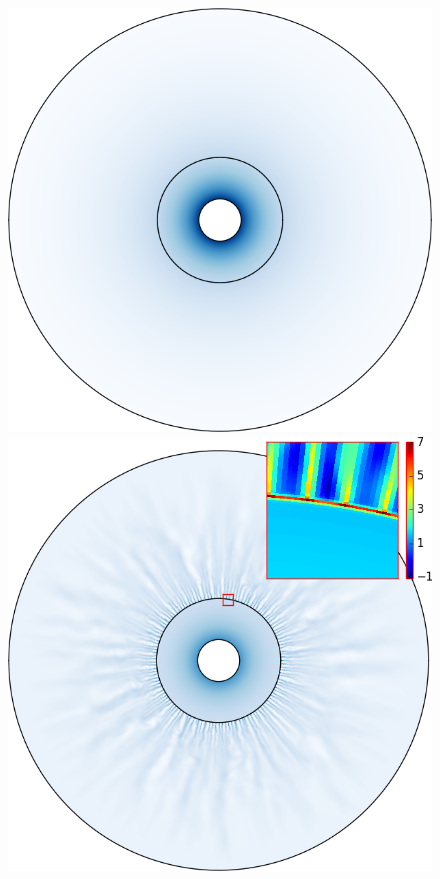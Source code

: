 \documentclass[preprint, 11pt]{article}
\begin{document}
\begin{figure}[!h]
  \centering
    \includegraphics[scale=0.3]{figures/chj_r2_rusanov_t5p0.png} \quad
    \quad \includegraphics[scale=0.3]{figures/chj_r2_blended_t5p0.png}

\end{figure}
\end{document}
